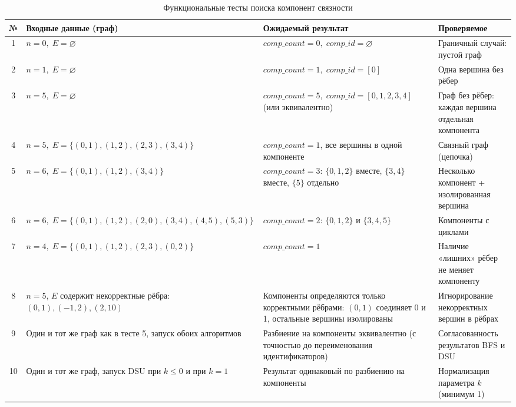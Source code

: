 \begin{table}[H]
\centering
\small
\setlength{\tabcolsep}{3pt}
\renewcommand{\arraystretch}{1.15}
\caption{Функциональные тесты поиска компонент связности}
\label{tab:func_tests_cc}
\begin{tabularx}{\linewidth}{|c|>{\raggedright\arraybackslash}X|>{\raggedright\arraybackslash}X|>{\raggedright\arraybackslash}X|}
\hline
\textbf{№} & \textbf{Входные данные (граф)} & \textbf{Ожидаемый результат} & \textbf{Проверяемое} \\
\hline
1 & $n=0,\; E=\varnothing$ &
$\textit{comp\_count}=0,\; \textit{comp\_id}=\varnothing$ &
Граничный случай: пустой граф \\
\hline
2 & $n=1,\; E=\varnothing$ &
$\textit{comp\_count}=1,\; \textit{comp\_id}=[0]$ &
Одна вершина без рёбер \\
\hline
3 & $n=5,\; E=\varnothing$ &
$\textit{comp\_count}=5,\; \textit{comp\_id}=[0,1,2,3,4]$ (или эквивалентно) &
Граф без рёбер: каждая вершина отдельная компонента \\
\hline
4 & $n=5,\; E=\{(0,1),(1,2),(2,3),(3,4)\}$ &
$\textit{comp\_count}=1$, все вершины в одной компоненте &
Связный граф (цепочка) \\
\hline
5 & $n=6,\; E=\{(0,1),(1,2),(3,4)\}$ &
$\textit{comp\_count}=3$: $\{0,1,2\}$ вместе, $\{3,4\}$ вместе, $\{5\}$ отдельно &
Несколько компонент + изолированная вершина \\
\hline
6 & $n=6,\; E=\{(0,1),(1,2),(2,0),(3,4),(4,5),(5,3)\}$ &
$\textit{comp\_count}=2$: $\{0,1,2\}$ и $\{3,4,5\}$ &
Компоненты с циклами \\
\hline
7 & $n=4,\; E=\{(0,1),(1,2),(2,3),(0,2)\}$ &
$\textit{comp\_count}=1$ &
Наличие «лишних» рёбер не меняет компоненту \\
\hline
8 & $n=5$, $E$ содержит некорректные рёбра: $(0,1),(-1,2),(2,10)$ &
Компоненты определяются только корректными рёбрами: $(0,1)$ соединяет 0 и 1, остальные вершины изолированы &
Игнорирование некорректных вершин в рёбрах \\
\hline
9 & Один и тот же граф как в тесте 5, запуск обоих алгоритмов &
Разбиение на компоненты эквивалентно (с точностью до переименования идентификаторов) &
Согласованность результатов BFS и DSU \\
\hline
10 & Один и тот же граф, запуск DSU при $k\le 0$ и при $k=1$ &
Результат одинаковый по разбиению на компоненты &
Нормализация параметра $k$ (минимум 1) \\
\hline
\end{tabularx}
\end{table}


